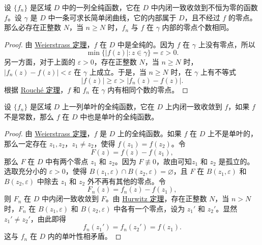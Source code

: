\documentclass[../../main.tex]{subfiles}%
\begin{document}
\begin{theorem}[Hurwitz定理]\label{theorem:Hurwitz定理}
设 \( \{f_n\} \) 是区域 \( D \) 中的一列全纯函数，它在 \( D \) 中内闭一致收敛到不恒为零的函数 \( f \)。设 \( \gamma \) 是 \( D \) 中一条可求长简单闭曲线，它的内部属于 \( D \)，且不经过 \( f \) 的零点。那么必存在正整数 \( N \)，当 \( n \geqslant  N \) 时，\( f_n \) 与 \( f \) 在 \( \gamma \) 内部的零点个数相同。
\end{theorem}
\begin{proof}
由 \hyperref[theorem:Weierstrass定理]{Weierstrass 定理}，\( f \) 在 \( D \) 中是全纯的。因为 \( f \) 在 \( \gamma \) 上没有零点，所以
\[
\min \{ |f(z)| : z \in \gamma \} = \varepsilon > 0.
\]
另一方面，对于上面的 \( \varepsilon > 0 \)，存在正整数 \( N \)，当 \( n \geqslant  N \) 时，\( |f_n(z) - f(z)| < \varepsilon \) 在 \( \gamma \) 上成立。于是，当 \( n \geqslant  N \) 时，在 \( \gamma \) 上有不等式
\[
|f(z)| \geqslant  \varepsilon > |f_n(z) - f(z)|.
\]
根据 \hyperref[theorem:theorem:Rouché定理-定理4.4.3]{Rouché 定理}，\( f \) 和 \( f_n \) 在 \( \gamma \) 内有相同个数的零点。
\end{proof}

\begin{theorem}\label{theorem:定理4.4.11}
设 \( \{f_n\} \) 是区域 \( D \) 上一列单叶的全纯函数，它在 \( D \) 上内闭一致收敛到 \( f \)，如果 \( f \) 不是常数，那么 \( f \) 在 \( D \) 中也是单叶的全纯函数。
\end{theorem}
\begin{proof}
由 \hyperref[theorem:Weierstrass定理]{Weierstrass 定理}，\( f \) 是 \( D \) 上的全纯函数。如果 \( f \) 在 \( D \) 上不是单叶的，那么一定存在 \( z_1, z_2 \)，\( z_1 \neq z_2 \)，使得 \( f(z_1) = f(z_2) \)。令
\[
F(z) = f(z) - f(z_1),
\]
那么 \( F \) 在 \( D \) 中有两个零点 \( z_1 \) 和 \( z_2 \)。因为 \( F \not\equiv 0 \)，故由可知\( z_1 \) 和 \( z_2 \) 是孤立的。选取充分小的 \( \varepsilon > 0 \)，使得 \( B(z_1, \varepsilon) \cap B(z_2, \varepsilon) = \varnothing \)，且 \( F \) 在 \( B(z_1, \varepsilon) \) 和 \( B(z_2, \varepsilon) \) 中除去 \( z_1 \) 和 \( z_2 \) 外不再有其他的零点。令
\[
F_n(z) = f_n(z) - f(z_1),
\]
则 \( F_n \) 在 \( D \) 中内闭一致收敛到 \( F \)。由 \hyperref[theorem:Hurwitz定理]{Hurwitz 定理}，存在正整数 \( N \)，当 \( n > N \) 时，\( F_n \) 在 \( B(z_1, \varepsilon) \) 和 \( B(z_2, \varepsilon) \) 中各有一个零点，设为 \( z_1' \) 和 \( z_2' \)。显然 \( z_1' \neq z_2' \)，由此即得
\[
f_n(z_1') = f_n(z_2') = f(z_1).
\]
这与 \( f_n \) 在 \( D \) 内的单叶性相矛盾。 
\end{proof}
\end{document}
